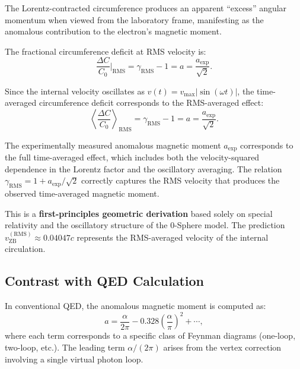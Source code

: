\documentclass[12pt,letterpaper]{article}
\begin{document}
The Lorentz-contracted circumference produces an apparent ``excess'' angular momentum when viewed from the laboratory frame, manifesting as the anomalous contribution to the electron's magnetic moment.

The fractional circumference deficit at RMS velocity is:
\begin{equation}
\frac{\Delta C}{C_0}\bigg|_{\mathrm{RMS}} = \gamma_{\mathrm{RMS}} - 1 = a = \frac{a_{\mathrm{exp}}}{\sqrt{2}}.
\end{equation}

Since the internal velocity oscillates as $v(t) = v_{\max}|\sin(\omega t)|$, the time-averaged circumference deficit corresponds to the RMS-averaged effect:
\begin{equation}
\left\langle \frac{\Delta C}{C_0} \right\rangle_{\mathrm{RMS}} 
= \gamma_{\mathrm{RMS}} - 1
= a 
= \frac{a_{\mathrm{exp}}}{\sqrt{2}}.
\end{equation}

The experimentally measured anomalous magnetic moment $a_{\mathrm{exp}}$ corresponds to the full time-averaged effect, which includes both the velocity-squared dependence in the Lorentz factor and the oscillatory averaging. The relation $\gamma_{\mathrm{RMS}} = 1 + a_{\mathrm{exp}}/\sqrt{2}$ correctly captures the RMS velocity that produces the observed time-averaged magnetic moment.

This is a \textbf{first-principles geometric derivation} based solely on special relativity and the oscillatory structure of the 0-Sphere model. The prediction $v_{\mathrm{ZB}}^{(\mathrm{RMS})} \approx 0.04047c$ represents the RMS-averaged velocity of the internal circulation.

\subsection{Contrast with QED Calculation}

In conventional QED, the anomalous magnetic moment is computed as:
\begin{equation}
a = \frac{\alpha}{2\pi} - 0.328 \left(\frac{\alpha}{\pi}\right)^2 + \cdots,
\end{equation}
where each term corresponds to a specific class of Feynman diagrams (one-loop, two-loop, etc.). The leading term $\alpha/(2\pi)$ arises from the vertex correction involving a single virtual photon loop.
\end{document}
